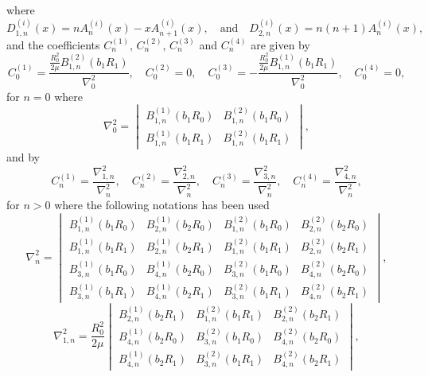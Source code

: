 where 
\begin{equation*}
	D_{1,n}^{(i)}(x) = nA_n^{(i)}(x)-xA_{n+1}^{(i)}(x),\quad\text{and}\quad	D_{2,n}^{(i)}(x) = n(n+1)A_n^{(i)}(x),
\end{equation*}
and the coefficients $C_n^{(1)}$, $C_n^{(2)}$, $C_n^{(3)}$ and $C_n^{(4)}$ are given by
\begin{equation*}
	C_0^{(1)} = \frac{\frac{R_0^2}{2\mu}B_{1,n}^{(2)}(b_1 R_1)}{\nabla^2_0},\quad C_0^{(2)}=0,\quad	C_0^{(3)} = -\frac{\frac{R_0^2}{2\mu}B_{1,n}^{(1)}(b_1 R_1)}{\nabla^2_0},\quad C_0^{(4)}=0,
\end{equation*}
for $n=0$ where
\begin{equation*}
	\nabla^2_0=\begin{vmatrix}
		B_{1,n}^{(1)}(b_1 R_0) & B_{1,n}^{(2)}(b_1 R_0)\\
		B_{1,n}^{(1)}(b_1 R_1) & B_{1,n}^{(2)}(b_1 R_1)
	\end{vmatrix},
\end{equation*}
and by
\begin{equation*}
	C_n^{(1)} = \frac{\nabla^2_{1,n}}{\nabla^2_n},\quad C_n^{(2)} = \frac{\nabla^2_{2,n}}{\nabla^2_n},\quad C_n^{(3)} = \frac{\nabla^2_{3,n}}{\nabla^2_n},\quad C_n^{(4)} = \frac{\nabla^2_{4,n}}{\nabla^2_n},
\end{equation*}
for $n>0$ where the following notations has been used
\begin{equation*}
	\nabla^2_n = \begin{vmatrix}
		B_{1,n}^{(1)}(b_1 R_0) & B_{2,n}^{(1)}(b_2 R_0) & B_{1,n}^{(2)}(b_1 R_0) & B_{2,n}^{(2)}(b_2 R_0)\\
		B_{1,n}^{(1)}(b_1 R_1) & B_{2,n}^{(1)}(b_2 R_1) & B_{1,n}^{(2)}(b_1 R_1) & B_{2,n}^{(2)}(b_2 R_1)\\
		B_{3,n}^{(1)}(b_1 R_0) & B_{4,n}^{(1)}(b_2 R_0) & B_{3,n}^{(2)}(b_1 R_0) & B_{4,n}^{(2)}(b_2 R_0)\\
		B_{3,n}^{(1)}(b_1 R_1) & B_{4,n}^{(1)}(b_2 R_1) & B_{3,n}^{(2)}(b_1 R_1) & B_{4,n}^{(2)}(b_2 R_1)
	\end{vmatrix},
\end{equation*}
\begin{equation*}
	\nabla^2_{1,n} = \frac{R_0^2}{2\mu}\begin{vmatrix}
		B_{2,n}^{(1)}(b_2 R_1) & B_{1,n}^{(2)}(b_1 R_1) & B_{2,n}^{(2)}(b_2 R_1)\\
		B_{4,n}^{(1)}(b_2 R_0) & B_{3,n}^{(2)}(b_1 R_0) & B_{4,n}^{(2)}(b_2 R_0)\\
		B_{4,n}^{(1)}(b_2 R_1) & B_{3,n}^{(2)}(b_1 R_1) & B_{4,n}^{(2)}(b_2 R_1)
	\end{vmatrix},
\end{equation*}
